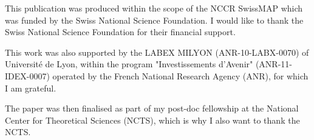 \documentclass[a4paper,oneside,11pt,leqno]{scrartcl} %
\renewcommand{\listoffigures}{\begingroup
\tocsection
\tocfile{\listfigurename}{lof}
\endgroup}
\renewcommand{\listoftables}{\begingroup
\tocsection
\tocfile{\listtablename}{lot}
\endgroup}
\theoremstyle{plain}
\theoremstyle{remark}
\theoremstyle{definition}
\begin{document}
This publication was produced within the scope of the NCCR SwissMAP which was funded by the Swiss National Science Foundation. I would like to thank the Swiss National Science Foundation for their financial support.

This work was also supported by the LABEX MILYON (ANR-10-LABX-0070) of Universit\'{e} de Lyon, within the program "Investissements d'Avenir" (ANR-11-IDEX-0007) operated by the French National Research Agency (ANR), for which I am grateful.

The paper was then finalised as part of my post-doc fellowship at the National Center for Theoretical Sciences (NCTS), which is why I also want to thank the NCTS.






\renewcommand\refname{List of References}




\end{document}
